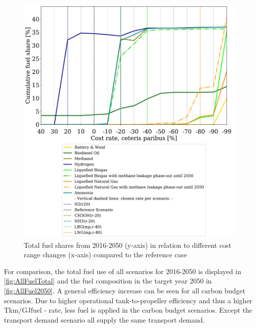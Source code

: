 \documentclass[article]{elsarticle}
\begin{document}
\begin{figure}[t]
    \centering
    \includegraphics[width=.75\textwidth]{figures/costVariation.pdf}
    \caption{Total fuel shares from 2016-2050 (y-axis) in relation to different cost range changes (x-axis) compared to the reference case}
    \label{fig:costVariation}
\end{figure}

For comparison, the total fuel use of all scenarios for 2016-2050 is displayed in \autoref{fig:AllFuelTotal} and the fuel composition in the target year 2050 in \autoref{fig:AllFuel2050}. A general efficiency increase can be seen for all carbon budget scenarios. Due to higher operational tank-to-propeller efficiency and thus a higher Tkm/GJfuel - rate, less fuel is applied in the carbon budget scenarios. Except the transport demand scenario all supply the same transport demand.
\end{document}
